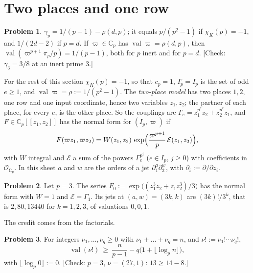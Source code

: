 \documentclass[reqno]{amsart}
\theoremstyle{plain}
\theoremstyle{definition}
\newtheorem{problem}{Problem}[section]
\theoremstyle{remark}
\newcommand{\C}{\mathbb{C}}
\newcommand{\Op}{\mathcal{O}_{\C_p}}
\newcommand{\val}{\operatorname{val}}
\begin{document}
\section{Two places and one row}\label{sec:model}

\begin{problem}\label{pr:gamma-sum}
\(\gamma_p = 1/(p-1) - \rho(d,p)\); it equals \(p/(p^2 - 1)\) if \(\chi_K(p) = -1\), and \(1/(2d - 2)\) if \(p = d\).  If \(\varpi \in \C_p\) has \(\val \varpi = \rho(d,p)\), then \(\val(\varpi^{p+1}\pi_p/p) = 1/(p-1)\), both for \(p\) inert and for \(p = d\).  [Check: \(\gamma_3 = 3/8\) at an inert prime \(3\).]
\end{problem}

For the rest of this section \(\chi_K(p) = -1\), so that \(c_p = 1\), \(I_p^\circ = I_p\) is the set of odd \(e \ge 1\), and \(\val\varpi = \rho := 1/(p^2-1)\).  The \emph{two-place model} has two places \(1, 2\), one row and one input coordinate, hence two variables \(z_1, z_2\); the partner of each place, for every \(e\), is the other place.  So the couplings are \(\Gamma_e = z_1^{p^e} z_2 + z_2^{p^e} z_1\), and \(F \in \C_p[[z_1, z_2]]\) has the normal form for \((I_p, \varpi)\) if
\[
  F(\varpi z_1, \varpi z_2) = W(z_1, z_2)\, \exp\Bigl(\frac{\varpi^{p+1}}{p}\, \mathcal E(z_1, z_2)\Bigr),
\]
with \(W\) integral and \(\mathcal E\) a sum of the powers \(\Gamma_e^{p^j}\) (\(e \in I_p\), \(j \ge 0\)) with coefficients in \(\Op\).  In this sheet \(a\) and \(w\) are the orders of a jet \(\partial_1^a \partial_2^w\), with \(\partial_i := \partial/\partial z_i\).

\begin{problem}\label{pr:first-series}
Let \(p = 3\).  The series \(F_0 := \exp\bigl((z_1^3 z_2 + z_1 z_2^3)/3\bigr)\) has the normal form with \(W = 1\) and \(\mathcal E = \Gamma_1\).  Its jets at \((a, w) = (3k, k)\) are \((3k)!/3^k\), that is \(2, 80, 13440\) for \(k = 1, 2, 3\), of valuations \(0, 0, 1\).
\end{problem}

The credit comes from the factorials.

\begin{problem}\label{pr:legendre}
For integers \(\nu_1, \dots, \nu_q \ge 0\) with \(\nu_1 + \dots + \nu_q = n\), and \(\nu! := \nu_1! \cdots \nu_q!\),
\[
  \val(\nu!) \ \ge\ \frac{n}{p-1} - q\bigl(1 + \lfloor \log_p n \rfloor\bigr),
\]
with \(\lfloor \log_p 0 \rfloor := 0\).  [Check: \(p = 3\), \(\nu = (27, 1)\): \(13 \ge 14 - 8\).]
\end{problem}
\end{document}
